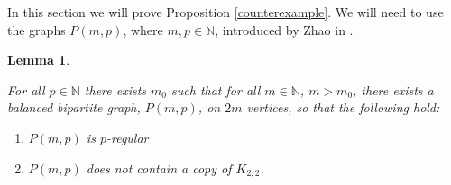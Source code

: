 \documentclass[oneside,12pt]{memoir}
\newtheorem{lemma}[theorem]{Lemma}
\begin{document}
In this section we will prove Proposition \ref{counterexample}.  We will need to use the graphs $P(m,p)$, where $m,p\in\mathbb{N}$, introduced by Zhao in \cite{Z}.

\begin{lemma}\label{No K22}

For all $p\in\mathbb{N}$ there exists $m_0$ such that for all $m\in \mathbb{N}$, $m>m_0$, there exists a balanced bipartite graph, $P(m,p)$, on $2m$ vertices, so that the following hold:
\begin{enumerate}
\item $P(m,p)$ is $p$-regular

\item $P(m,p)$ does not contain a copy of $K_{2,2}$.
\end{enumerate}

\end{lemma}
\end{document}
